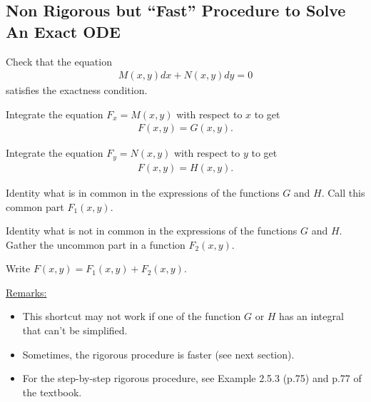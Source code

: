 \documentclass[12pt,a4paper]{article}
\begin{document}
	\subsection{Non Rigorous but ``Fast'' Procedure to Solve An Exact ODE}
	\begin{enumerate}[label=\textbf{[\Roman*]}]
	\item Check that the equation
		\begin{align*}
		M (x, y) dx + N(x, y) dy = 0
		\end{align*}
	satisfies the exactness condition.
	\item Integrate the equation $F_x = M (x, y)$ with respect to $x$ to get
		\begin{align*}
		F (x, y) = G(x, y) .
		\end{align*}
	\item Integrate the equation $F_y = N(x, y)$ with respect to $y$ to get
		\begin{align*}
		F(x, y) = H (x, y) .
		\end{align*}
	\item Identity what is in common in the expressions of the functions $G$ and $H$. Call this common part $F_1 (x, y)$.
	\item Identity what is not in common in the expressions of the functions $G$ and $H$. Gather the uncommon part in a function $F_2 (x, y)$.
	\item Write $F (x, y) = F_1 (x, y) + F_2 (x, y)$.
	\end{enumerate}
	
\vspace*{16pt}
	
\underline{Remarks:}
	\begin{itemize}
	\item This shortcut may not work if one of the function $G$ or $H$ has an integral that can't be simplified.
	\item Sometimes, the rigorous procedure is faster (see next section).
	\item For the step-by-step rigorous procedure, see Example 2.5.3 (p.75) and p.77 of the textbook.
	\end{itemize}
\end{document}
